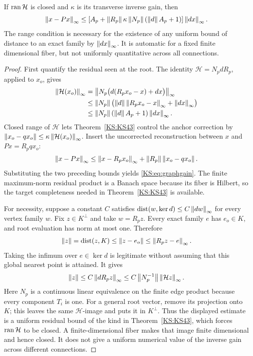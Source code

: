 \begin{KStheorem}\label{KS:KS44}
If \(\operatorname{ran}\mathcal H\) is closed and \(\kappa\) is its transverse inverse gain, then
\begin{equation}\label{KS:eq:graphgain}
 \left\lVert x-Px\right\rVert_\infty\le
 \left[A_p+\left\lVert R_p\right\rVert\kappa\left\lVert N_p\right\rVert(\left\lVert d\right\rVert A_p+1)\right]
 \left\lVert dx\right\rVert_\infty.
\end{equation}
The range condition is necessary for the existence of any uniform bound of distance to an exact family by \(\left\lVert dx\right\rVert_\infty\). It is automatic for a fixed finite dimensional fiber, but not uniformly quantitative across all connections.
\end{KStheorem}
\begin{proof}
First quantify the residual seen at the root. The identity \(\mathcal H=N_pdR_p\), applied to \(x_o\), gives
\[
 \begin{aligned}
 \left\lVert\mathcal H(x_o)\right\rVert_\infty
 &=\left\lVert N_p\bigl(d(R_px_o-x)+dx\bigr)\right\rVert_\infty\\
 &\le\left\lVert N_p\right\rVert\bigl(\left\lVert d\right\rVert\left\lVert R_px_o-x\right\rVert_\infty+\left\lVert dx\right\rVert_\infty\bigr)\\
 &\le\left\lVert N_p\right\rVert(\left\lVert d\right\rVert A_p+1)\left\lVert dx\right\rVert_\infty.
 \end{aligned}
\]
Closed range of \(\mathcal H\) lets Theorem~\ref{KS:KS43} control the anchor correction by
\(\left\lVert x_o-qx_o\right\rVert\le\kappa\left\lVert\mathcal H(x_o)\right\rVert_\infty\). Insert the uncorrected reconstruction between \(x\) and \(Px=R_pqx_o\):
\[
 \left\lVert x-Px\right\rVert_\infty
 \le\left\lVert x-R_px_o\right\rVert_\infty+\left\lVert R_p\right\rVert\left\lVert x_o-qx_o\right\rVert.
\]
Substituting the two preceding bounds yields \eqref{KS:eq:graphgain}. The finite maximum-norm residual product is a Banach space because its fiber is Hilbert, so the target completeness needed in Theorem~\ref{KS:KS43} is available.

For necessity, suppose a constant \(C\) satisfies
\(\operatorname{dist}(w,\ker d)\le C\left\lVert dw\right\rVert_\infty\) for every vertex family \(w\). Fix \(z\in K^\perp\) and take \(w=R_pz\). Every exact family \(e\) has \(e_o\in K\), and root evaluation has norm at most one. Therefore
\[
 \left\lVert z\right\rVert=\operatorname{dist}(z,K)\le\left\lVert z-e_o\right\rVert\le\left\lVert R_pz-e\right\rVert_\infty.
\]
Taking the infimum over \(e\in\ker d\) is legitimate without assuming that this global nearest point is attained. It gives
\[
 \left\lVert z\right\rVert\le C\left\lVert dR_pz\right\rVert_\infty
 \le C\left\lVert N_p^{-1}\right\rVert\left\lVert\mathcal Hz\right\rVert_\infty.
\]
Here \(N_p\) is a continuous linear equivalence on the finite edge product because every component \(T_i\) is one. For a general root vector, remove its projection onto \(K\); this leaves the same \(\mathcal H\)-image and puts it in \(K^\perp\). Thus the displayed estimate is a uniform residual bound of the kind in Theorem~\ref{KS:KS43}, which forces \(\operatorname{ran}\mathcal H\) to be closed. A finite-dimensional fiber makes that image finite dimensional and hence closed. It does not give a uniform numerical value of the inverse gain across different connections.
\end{proof}
